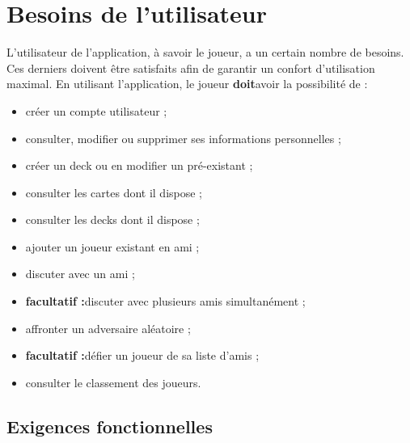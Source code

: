\documentclass[12pt]{article}
\let\simplesection\section
\renewcommand{\section}{\clearpage\simplesection}
\let\simplesubsection\subsection
\renewcommand{\subsection}{
	\needspace{0.5\pagetotal}
	\simplesubsection
}
\newcommand{\doit}{\textbf{doit}}
\newcommand{\faclt}{\textbf{\gls{facultatif} :}}
\begin{document}
\section{Besoins de l'utilisateur}
	L'utilisateur de l'application, à savoir le joueur, a un certain nombre de besoins. Ces derniers doivent être satisfaits afin de garantir un confort d'utilisation
	maximal. En utilisant l'application, le joueur \doit avoir la possibilité de :

	\begin{itemize}
		\item créer un compte utilisateur ;
		\item consulter, modifier ou supprimer ses informations personnelles ; 
		\item créer un \gls{deck} ou en modifier un pré-existant ;
		\item consulter les cartes dont il dispose ;
		\item consulter les \glspl{deck} dont il dispose ;
		\item ajouter un joueur existant en ami ;
		\item discuter avec un ami ;
		\item \faclt discuter avec plusieurs amis simultanément ;
		\item affronter un adversaire aléatoire ;
		\item \faclt défier un joueur de sa liste d'amis ;
		\item consulter le classement des joueurs.
	\end{itemize}

	\subsection{Exigences fonctionnelles}
\end{document}
